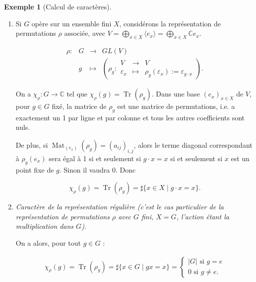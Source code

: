 \documentclass[french]{book}
\theoremstyle{definition}
\newtheorem*{protoexemple}{Exemple}
\newenvironment{exemple}
    {\colorlet{shadecolor}{gray!10}\begin{shaded}\begin{protoexemple}}
    {\end{protoexemple}\end{shaded}}
\begin{document}
\begin{exemple}[Calcul de caractères]

  \

  \begin{enumerate}
    \item Si \(G\) opère sur un ensemble fini \(X\), considérons la représentation de permutations \(\rho\) associée, avec \(V = \bigoplus _{x \in X} \langle e_x \rangle = \bigoplus _{x \in X} \mathbb{C} e_x\).

    \[\begin{matrix}
    \rho : & G & \longrightarrow & GL(V) \\
    \ & g & \longmapsto &\left( \rho_g : \begin{matrix}
    V & \longrightarrow & V \\
    \varepsilon_x & \longmapsto & \rho_g(\varepsilon_x) := \varepsilon _{g \cdot x}
    \end{matrix} \right).
    \end{matrix}\]

    On a \(\chi _{\rho} : G \longrightarrow \mathbb{C}\) tel que \(\chi _{\rho}(g) = \operatorname{Tr}(\rho_g)\). Dans une base \((e_x) _{x \in X}\) de \(V\), pour \(g \in G\) fixé, la matrice de \(\rho_g\) est une matrice de permutations, i.e. a exactement un 1 par ligne et par colonne et tous les autres coefficients sont nuls.

    De plus, si \(\operatorname{Mat} _{(e_x)} (\rho_g) = (a _{ij}) _{i,j}\), alors le terme diagonal correspondant à \(\rho_g(e_x)\) sera égal à 1 si et seulement si \(g \cdot x = x\) si et seulement si \(x\) est un point fixe de \(g\). Sinon il vaudra 0. Donc

    \[\chi _{\rho}(g) = \operatorname{Tr}(\rho_g) = \sharp \{ x \in X \mid g \cdot x = x \}.\]

    \item \emph{Caractère de la représentation régulière (c'est le cas particulier de la représentation de permutations \(\rho\) avec \(G\) fini, \(X = G\), l'action étant la multiplication dans \(G\)).}

    On a alors, pour tout \(g \in G\) :

    \begin{gather}
      \chi _{\rho}(g) = \operatorname{Tr}(\rho_g) = \sharp \{ x \in G \mid g x=x \} = \begin{cases}
        \lvert G \rvert \text{ si } g=e \\
        0 \text{ si } g \neq e.
      \end{cases}
    \end{gather}
  \end{enumerate}
\end{exemple}
\end{document}
